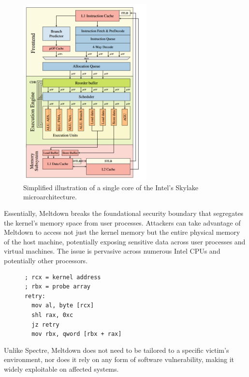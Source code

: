 \begin{enumerate}
    \begin{figure}[H]
      \centering
      \includegraphics[width=0.6\textwidth]{images/intel-cpu.png}
      \caption{Simplified illustration of a single core of the Intel's Skylake microarchitecture.\cite{lippMeltdown2018}}
      \label{fig:meltdown}
    \end{figure}

      Essentially, Meltdown breaks the foundational security boundary that segregates the kernel's memory space from user processes. Attackers can take advantage of Meltdown to access not just the kernel memory but the entire physical memory of the host machine, potentially exposing sensitive data across user processes and virtual machines. The issue is pervasive across numerous Intel CPUs and potentially other processors.\cite{lippMeltdown2018} 

    \begin{verbatim}
      ; rcx = kernel address 
      ; rbx = probe array 
      retry: 
        mov al, byte [rcx] 
        shl rax, 0xc 
        jz retry
        mov rbx, qword [rbx + rax]
    \end{verbatim}

      Unlike Spectre, Meltdown does not need to be tailored to a specific victim's environment, nor does it rely on any form of software vulnerability, making it widely exploitable on affected systems.

\end{enumerate}

